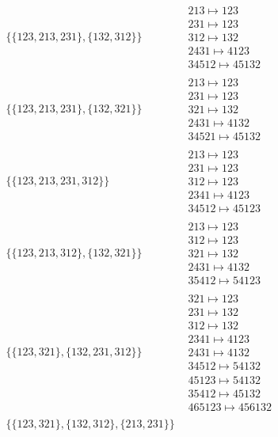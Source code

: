 \begin{tiny}
\begin{align}
\begin{matrix}
\end{matrix}
\\
\{\{123, 213, 231\}, \{132, 312\}\}
\quad
&
\begin{matrix}
213 \mapsto 123\\231 \mapsto 123\\312 \mapsto 132\\2431 \mapsto 4123\\34512 \mapsto 45132
\end{matrix}
\\
\{\{123, 213, 231\}, \{132, 321\}\}
\quad
&
\begin{matrix}
213 \mapsto 123\\231 \mapsto 123\\321 \mapsto 132\\2431 \mapsto 4132\\34521 \mapsto 45132
\end{matrix}
\\
\{\{123, 213, 231, 312\}\}
\quad
&
\begin{matrix}
213 \mapsto 123\\231 \mapsto 123\\312 \mapsto 123\\2341 \mapsto 4123\\34512 \mapsto 45123
\end{matrix}
\\
\{\{123, 213, 312\}, \{132, 321\}\}
\quad
&
\begin{matrix}
213 \mapsto 123\\312 \mapsto 123\\321 \mapsto 132\\2431 \mapsto 4132\\35412 \mapsto 54123
\end{matrix}
\\
\{\{123, 321\}, \{132, 231, 312\}\}
\quad
&
\begin{matrix}
321 \mapsto 123\\231 \mapsto 132\\312 \mapsto 132\\2341 \mapsto 4123\\2431 \mapsto 4132\\34512 \mapsto 54132\\45123 \mapsto 54132\\35412 \mapsto 45132\\465123 \mapsto 456132
\end{matrix}
\\
\{\{123, 321\}, \{132, 312\}, \{213, 231\}\}

\end{align}
\end{tiny}
